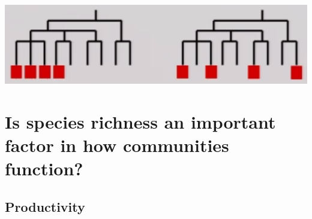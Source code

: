 \begin{frame}[t]
\begin{adjustwidth}{-2em}{-1.5em}
\begin{uncoverenv}
\begin{itemize}
        \end{itemize}

        \centerline{
            \includegraphics[height=0.15\textheight]{phylo-diversity.png}}
        \end{uncoverenv}
    \end{adjustwidth}
\end{frame}

\section[Does species richness affect community function?]{Is species richness
    an important factor in how communities function?}

\subsection{Productivity}

